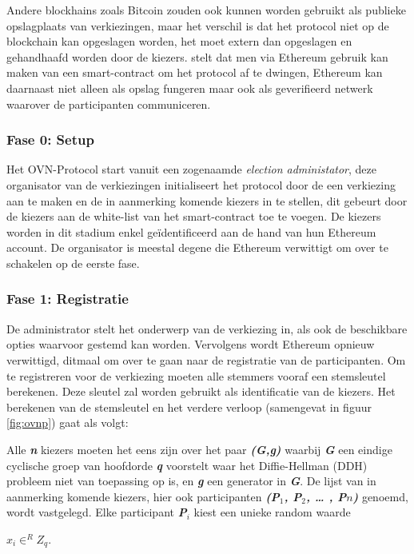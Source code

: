 			Andere blockhains zoals Bitcoin zouden ook kunnen worden gebruikt als publieke opslagplaats van verkiezingen, maar het verschil is dat het protocol niet op de blockchain kan opgeslagen worden, het moet extern dan opgeslagen en gehandhaafd worden door de kiezers. \textcite{McCorry2017} stelt dat men via Ethereum gebruik kan maken van een smart-contract om  het protocol af te dwingen, Ethereum kan daarnaast niet alleen als opslag fungeren maar ook als geverifieerd netwerk waarover de participanten communiceren.
		\subsubsection*{Fase 0: Setup }
			Het OVN-Protocol start vanuit een zogenaamde \textit{election administator}, deze organisator van de verkiezingen initialiseert het protocol door de een verkiezing aan te maken en de in aanmerking komende kiezers in te stellen, dit gebeurt door de kiezers aan de white-list van het smart-contract toe te voegen. De kiezers worden in dit stadium enkel geïdentificeerd aan de hand van hun Ethereum account. De organisator is meestal degene die  Ethereum verwittigt om over te schakelen op de eerste fase.
		\subsubsection*{Fase 1: Registratie }
			De administrator stelt het onderwerp van de verkiezing in, als ook de beschikbare opties waarvoor gestemd kan worden. Vervolgens wordt Ethereum opnieuw verwittigd, ditmaal om over te gaan naar de registratie van de participanten. Om te registreren voor de verkiezing moeten alle stemmers vooraf een stemsleutel berekenen. Deze sleutel zal worden gebruikt als identificatie van de kiezers. Het berekenen  van de stemsleutel en het verdere verloop (samengevat in figuur \ref{fig:ovnp}) gaat als volgt: 
			
			Alle \textbf{\textit{n}} kiezers moeten het eens zijn over het paar \textbf{\textit{(G,g)}} waarbij \textbf{\textit{G}} een eindige cyclische groep van hoofdorde \textbf{\textit{q}} voorstelt waar het Diffie-Hellman (DDH) probleem niet van toepassing op is, en \textbf{\textit{g}} een generator in \textbf{\textit{G}}. De lijst van in aanmerking komende kiezers, hier ook participanten \textbf{\textit{(P$_{1}$, P$_{2}$, … , P${n}$)}} genoemd, wordt vastgelegd. Elke participant \textbf{\textit{P$_{i}$}} kiest een unieke random waarde  
			
			\textbf{\textit{$x_{i} \in^{R} Z_{q}$}}.
			
